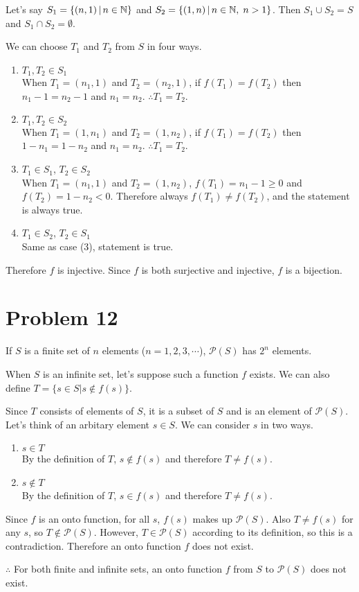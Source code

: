 \documentclass[10pt]{article}
\begin{document}
\vspace{0.3cm} Let's say $S_1 = \qty{(n, 1) \,|\, n \in \mathbb{N}}$ and $S_2 = \qty{(1, n) \,|\, n \in \mathbb{N}, \; n > 1}$.
Then $S_1 \cup S_2 = S$ and $S_1 \cap S_2 = \emptyset$. 

\vspace{0.3cm} We can choose $T_1$ and $T_2$ from $S$ in four ways. 
\renewcommand\labelenumi{(\theenumi)}
\begin{enumerate}
  \item $T_1, T_2 \in S_1$ \\
  When $T_1 = (n_1, 1)$ and $T_2 = (n_2, 1)$, 
  if $f(T_1) = f(T_2)$ then $n_1 - 1 = n_2 - 1$ and $n_1 = n_2$. $\therefore T_1 = T_2$.
  \item $T_1, T_2 \in S_2$ \\
  When $T_1 = (1, n_1)$ and $T_2 = (1, n_2)$, 
  if $f(T_1) = f(T_2)$ then $1 - n_1 = 1 - n_2$ and $n_1 = n_2$. $\therefore T_1 = T_2$.
  \item $T_1 \in S_1$, $T_2 \in S_2$ \\
  When $T_1 = (n_1, 1)$ and $T_2 = (1, n_2)$, $f(T_1) = n_1 - 1 \geq 0$ and $f(T_2) = 1 - n_2 < 0$. Therefore always $f(T_1) \neq f(T_2)$, and the statement is always true. 
  \item $T_1 \in S_2$, $T_2 \in S_1$ \\
  Same as case (3), statement is true.
\end{enumerate}
Therefore $f$ is injective. Since $f$ is both surjective and injective, $f$ is a bijection.

\section*{Problem 12}
If $S$ is a finite set of $n$ elements ($n = 1, 2, 3, \cdots$), $\mathcal P(S)$ has $2^n$ elements. 

\vspace{0.3cm} When $S$ is an infinite set, let's suppose such a function $f$ exists. We can also define $T = \{s \in S | s  \notin f (s) \}$.

\vspace{0.3cm} Since $T$ consists of elements of $S$, it is a subset of $S$ and is an element of $\mathcal P(S)$. Let's think of an arbitary element $s \in S$. 
We can consider $s$ in two ways.
\begin{enumerate}
  \item $s \in T$ \\
  By the definition of $T$, $s \notin f(s)$ and therefore $T \neq f(s)$.
  \item $s \notin T$ \\
  By the definition of $T$, $s \in f(s)$ and therefore $T \neq f(s)$.
\end{enumerate}
Since $f$ is an onto function, for all $s$, $f(s)$ makes up $\mathcal P(S)$.
Also $T \neq f(s)$ for any $s$, so $T\notin \mathcal P(S)$. 
However, $T \in \mathcal P(S)$ according to its definition, so this is a contradiction. 
Therefore an onto function $f$ does not exist.

\vspace{0.3cm} $\therefore$ For both finite and infinite sets, an onto function $f$ from $S$ to $\mathcal P(S)$ does not exist.
\end{document}
